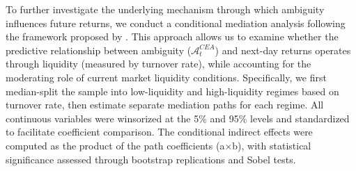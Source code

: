 \documentclass[preprint,12pt,authoryear]{elsarticle}
\begin{document}
To further investigate the underlying mechanism through which ambiguity influences future returns, we conduct a conditional mediation analysis following the framework proposed by \cite{preacher2007moderated}. This approach allows us to examine whether the predictive relationship between ambiguity ($\mathcal{A}^{CEA}_t$) and next-day returns operates through liquidity (measured by turnover rate), while accounting for the moderating role of current market liquidity conditions. Specifically, we first median-split the sample into low-liquidity and high-liquidity regimes based on turnover rate, then estimate separate mediation paths for each regime. All continuous variables were winsorized at the 5\% and 95\% levels and standardized to facilitate coefficient comparison. The conditional indirect effects were computed as the product of the path coefficients (a$\times$b), with statistical significance assessed through bootstrap replications and Sobel tests.
\end{document}
